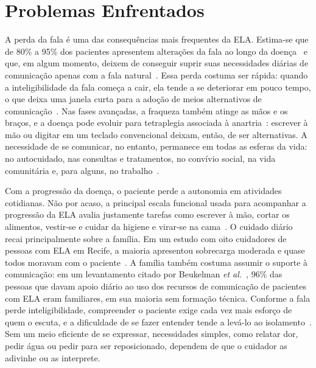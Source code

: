 \section{Problemas Enfrentados} \label{sec:problemas}

A perda da fala é uma das consequências mais frequentes da \gls{ELA}. Estima-se que de 80\% a 95\% dos pacientes apresentem alterações da fala ao longo da doença~\cite{pcdt_ela2020} e que, em algum momento, deixem de conseguir suprir suas necessidades diárias de comunicação apenas com a fala natural~\cite{beukelman2011communication}. Essa perda costuma ser rápida: quando a inteligibilidade da fala começa a cair, ela tende a se deteriorar em pouco tempo, o que deixa uma janela curta para a adoção de meios alternativos de comunicação~\cite{beukelman2011communication}. Nas fases avançadas, a fraqueza também atinge as mãos e os braços, e a doença pode evoluir para tetraplegia associada à anartria~\cite{caligari2013eye}: escrever à mão ou digitar em um teclado convencional deixam, então, de ser alternativas. A necessidade de se comunicar, no entanto, permanece em todas as esferas da vida: no autocuidado, nas consultas e tratamentos, no convívio social, na vida comunitária e, para alguns, no trabalho~\cite{beukelman2011communication}.

Com a progressão da doença, o paciente perde a autonomia em atividades cotidianas. Não por acaso, a principal escala funcional usada para acompanhar a progressão da \gls{ELA} avalia justamente tarefas como escrever à mão, cortar os alimentos, vestir-se e cuidar da higiene e virar-se na cama~\cite{cedarbaum1999alsfrs}. O cuidado diário recai principalmente sobre a família. Em um estudo com oito cuidadores de pessoas com \gls{ELA} em Recife, a maioria apresentou sobrecarga moderada e quase todos moravam com o paciente~\cite{almeida2017sobrecarga}. A família também costuma assumir o suporte à comunicação: em um levantamento citado por Beukelman \textit{et al.}~\cite{beukelman2011communication}, 96\% das pessoas que davam apoio diário ao uso dos recursos de comunicação de pacientes com \gls{ELA} eram familiares, em sua maioria sem formação técnica. Conforme a fala perde inteligibilidade, compreender o paciente exige cada vez mais esforço de quem o escuta, e a dificuldade de se fazer entender tende a levá-lo ao isolamento~\cite{pcdt_ela2020}. Sem um meio eficiente de se expressar, necessidades simples, como relatar dor, pedir água ou pedir para ser reposicionado, dependem de que o cuidador as adivinhe ou as interprete.

